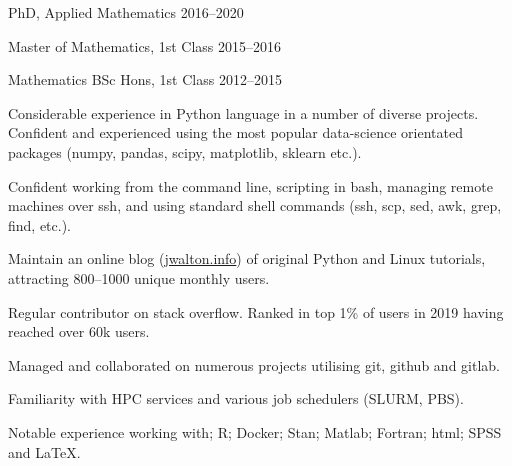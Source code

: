 \documentclass[12pt, a4paper]{article}
\begin{document}

\makecard





%
        {PhD, Applied Mathematics}%
        {2016--2020}

%
        {Master of Mathematics, 1st Class}%
        {2015--2016}

%
        {Mathematics BSc Hons, 1st Class}%
        {2012--2015}




%
       {Considerable experience in Python language in a number of diverse
        projects. Confident and experienced using the most popular
        data-science orientated packages (numpy, pandas, scipy, matplotlib,
        sklearn etc.).}

%
        {Confident working from the command line, scripting in bash, managing
         remote machines over ssh, and using standard shell commands (ssh, scp,
         sed, awk, grep, find, etc.).}

%
       {Maintain an online blog (\href{https://jwalton.info}{jwalton.info}) of
        original Python and Linux tutorials, attracting 800--1000 unique monthly
        users.}

%
       {Regular contributor on stack overflow. Ranked in top 1\% of users in
        2019 having reached over 60k users.}

%
       {Managed and collaborated on numerous projects utilising git, github
        and gitlab.}

%
       {Familiarity with HPC services and various job schedulers (SLURM, PBS).}

%
       {Notable experience working with; R; Docker; Stan; Matlab; Fortran; html; SPSS
        and \LaTeX{}.}



\end{document}
